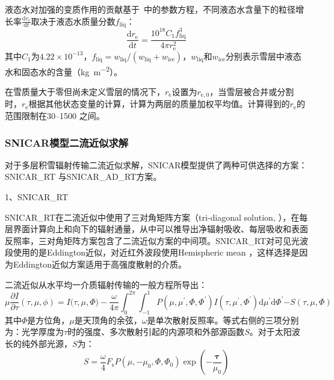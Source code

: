 液态水对加强的变质作用的贡献基于~\citet{brun1989InvestigationWetSnowMetamorphism}中的参数方程，不同液态水含量下的粒径增长率$\frac{{{\mathrm d}r}_{\mathrm e}}{{\mathrm d}t}$取决于液态水质量分数$f_{\mathrm{liq}}$：
%
\begin{equation}
  \frac{{{\mathrm d}r}_{\mathrm e}}{{\mathrm d}t} = \frac{10^{18}C_{1}f_{\mathrm{liq}}^{3}}{4\pi r_{\mathrm e}^{2}}
\end{equation}
%
其中$C_{1}$为$4.22×10^{-13}$，$f_{\mathrm{liq}}=w_{\mathrm{liq}}/(w_{\mathrm{liq}}+w_{\mathrm{ice}})$，$w_{\mathrm{liq}}$和$w_{\mathrm{ice}}$分别表示雪层中液态水和固态水的含量（\unit {kg.m^{-2}}）。

在雪质量大于零但尚未定义雪层的情况下，$r_{\mathrm e}$设置为$r_{\mathrm {e,0}}$，当雪层被合并或分割时，$r_{\mathrm e}$根据其他状态变量的计算，计算为两层的质量加权平均值。计算得到的$r_{\mathrm e}$的范围限制在30--1500 \unit{}之间。

\subsubsection{SNICAR模型二流近似求解}

对于多层积雪辐射传输二流近似求解，SNICAR模型提供了两种可供选择的方案：SNICAR\_RT \citep{dang2019IntercomparisonImprovementTwostream}与SNICAR\_AD\_RT方案\citep{flanner2021SNICARADv3CommunityTool}。

1、SNICAR\_RT

SNICAR\_RT在二流近似中使用了三对角矩阵方案（tri-diagonal
solution, \citet{toon1989RapidCalculationRadiative}），在每层界面计算向上和向下的辐射通量，从中可以推导出净辐射吸收、每层吸收和表面反照率，三对角矩阵方案包含了二流近似方案的中间项。SNICAR\_RT对可见光波段使用的是Eddington近似\citep{wiscombe1980ModelSpectralAlbedo}，对近红外波段使用Hemispheric mean \citep{toon1989RapidCalculationRadiative}，这样选择是因为Eddington近似方案适用于高强度散射的介质。

二流近似从水平均一介质辐射传输的一般方程所导出：
%
\begin{equation}
  \mu\frac{\partial {I}}{\partial\tau}(\tau,\mu,\phi){= I(\tau,}\mu,\Phi) - \frac{\omega}{{4}{\pi}}\int_{{0}}^{{2}\pi}{\int_{- 1}^{1}{P\left( \mu,\mu^{'},\Phi,\Phi^{'} \right)}}I\left( \tau,\mu^{'},\Phi^{'} \right){\mathrm d}\mu^{'}{\mathrm d}\Phi^{'}{- S}\left( \tau,\mu,\Phi \right)
\end{equation}
%
其中\(\Phi\)是方位角，\(\mu\)是天顶角的余弦，\(\omega\)是单次散射反照率。等式右侧的三项分别为：光学厚度为\(\tau\)时的强度、多次散射引起的内源项和外部源函数$S$。对于太阳波长的纯外部光源，$S$为：
%
\begin{equation}
  S = \frac{\omega}{4}F_{\mathrm s}P\left( \mu,{- \mu}_{0},\Phi,\Phi_{0} \right)\exp\left( -\frac{\mathbf{\tau}}{\mu_{0}} \right)
\end{equation}

